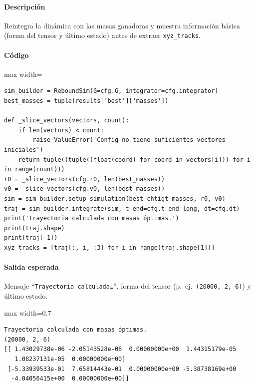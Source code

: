 \paragraph{Descripción} Reintegra la dinámica con las masas ganadoras y muestra información básica (forma del tensor y último estado) antes de extraer \texttt{xyz\_tracks}.
\paragraph{Código}
\par\smallskip
\begin{listing}[H]
\caption{Celda 22: integración prolongada con masas óptimas}
\begin{adjustbox}{max width=\textwidth}
\begin{minipage}{\textwidth}
\begin{verbatim}
sim_builder = ReboundSim(G=cfg.G, integrator=cfg.integrator)
best_masses = tuple(results['best']['masses'])

def _slice_vectors(vectors, count):
    if len(vectors) < count:
        raise ValueError('Config no tiene suficientes vectores iniciales')
    return tuple((tuple((float(coord) for coord in vectors[i])) for i in range(count)))
r0 = _slice_vectors(cfg.r0, len(best_masses))
v0 = _slice_vectors(cfg.v0, len(best_masses))
sim = sim_builder.setup_simulation(best_chtigt_masses, r0, v0)
traj = sim_builder.integrate(sim, t_end=cfg.t_end_long, dt=cfg.dt)
print('Trayectoria calculada con masas óptimas.')
print(traj.shape)
print(traj[-1])
xyz_tracks = [traj[:, i, :3] for i in range(traj.shape[1])]
\end{verbatim}
\end{minipage}
\end{adjustbox}
\end{listing}
\paragraph{Salida esperada} Mensaje ``\texttt{Trayectoria calculada\dots}'', forma del tensor (p.\ ej.\ \texttt{(20000, 2, 6)}) y último estado.

\begin{listing}[H]
\caption{Ejemplo Salida}
\begin{adjustbox}{max width=0.7\textwidth}
\begin{minipage}{\textwidth}
\begin{verbatim}
Trayectoria calculada con masas óptimas.
(20000, 2, 6)
[[ 1.43029738e-06 -2.05143528e-06  0.00000000e+00  1.44315179e-05
   1.08237131e-05  0.00000000e+00]
 [-5.33939533e-01  7.65814443e-01  0.00000000e+00 -5.38738169e+00
  -4.04056415e+00  0.00000000e+00]]
\end{verbatim}
\end{minipage}
\end{adjustbox}
\end{listing}

